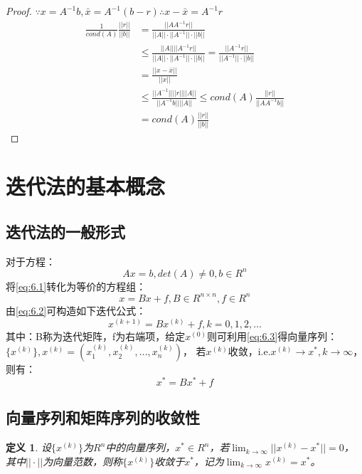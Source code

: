 \documentclass[a4paper]{article}
\newtheorem{definition}{定义}[section]
\begin{document}
\begin{proof}
  $\because x=A^{-1}b, \bar{x}=A^{-1}(b-r) \therefore x-\bar{x}=A^{-1}r $\\
  \begin{equation*}
    \begin{split}
      \frac{1}{cond(A)}\frac{||r||}{||b||} &= \frac{||AA^{-1}r||}{||A||\cdot||A^{-1}||\cdot||b||} \\
      &\le \frac{||A||||A^{-1}r||}{||A||\cdot||A^{-1}||\cdot||b||} = \frac{||A^{-1}r||}{||A^{-1}||\cdot||b||} \\
      &=\frac{||x-\bar{x}||}{||x||} \\
      &\le \frac{||A^{-1}||||r||||A||}{||A^{-1}b||||A||} \le cond(A)\frac{||r||}{||AA^{-1}b||} \\
      &= cond(A)\frac{||r||}{||b||}
    \end{split}
  \end{equation*}
\end{proof}

\section{迭代法的基本概念}
\subsection{迭代法的一般形式}
对于方程：
\begin{equation}
  Ax=b, det(A)\neq 0, b\in R^n
  \label{eq:6.1}
\end{equation}
将\ref{eq:6.1}转化为等价的方程组：
\begin{equation}
  x= Bx+f, B\in R^{n\times n}, f\in R^n
  \label{eq:6.2}
\end{equation}
由\ref{eq:6.2}可构造如下迭代公式：
\begin{equation}
  x^{(k+1)}=Bx^{(k)}+f, k=0,1,2,\dots
  \label{eq:6.3}
\end{equation}
其中：B称为迭代矩阵，f为右端项，给定$x^{(0)}$则可利用\ref{eq:6.3}得向量序列：$\{x^{(k)}\},x^{(k)}=(x_1^{(k)}, x_2^{(k)}, \dots, x_n^{(k)}) $，
若$x^{(k)}$收敛，i.e.$x^{(k)}\rightarrow x^*, k\rightarrow \infty$，则有：
$$x^*=Bx^*+f $$

\subsection{向量序列和矩阵序列的收敛性}
\begin{definition}
  设$\{x^{(k)}\}$为$R^n$中的向量序列，$x^*\in R^n$，若$\lim_{k\rightarrow \infty}||x^{(k)} - x^*||=0 $，
  其中$||\cdot||$为向量范数，则称$\{x^{(k)}\}$收敛于$x^*$，记为$\lim_{k\rightarrow \infty}x^{(k)} = x^* $。
\end{definition}
\end{document}
